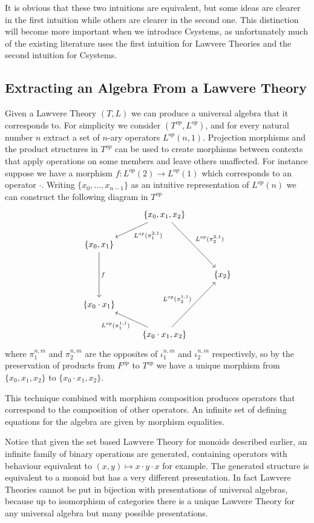 It is obvious that these two intuitions are equivalent, but some ideas are
clearer in the first intuition while others are clearer in the second one. This
distinction will become more important when we introduce Csystems, as
unfortunately much of the existing literature uses the first intuition for
Lawvere Theories and the second intuition for Csystems.

\subsection{Extracting an Algebra From a Lawvere Theory}
Given a Lawvere Theory $(T,L)$ we can produce a universal algebra that it
corresponds to. For simplicity we consider $(T^{op}, L^{op})$, and for every
natural number $n$ extract a set of $n$-ary operators $L^{op}(n,1)$. Projection
morphisms and the product structures in $T^{op}$ can be used to create morphisms
between contexts that apply operations on some members and leave others
unaffected. For instance suppose we have a morphism $f : L^{op}(2)\to L^{op}(1)$
which corresponds to an operator $\cdot$. Writing $\{x_0,\ldots, x_{n-1}\}$ as
an intuitive representation of $L^{op}(n)$ we can construct the following
diagram in $T^{op}$
\[
\begin{tikzcd}
    &\{x_0, x_1, x_2\}
    \ar[ld, "L^{op}({\pi_{1}^{2,1}})"]
    \ar[rdd, "L^{op}({\pi_{2}^{2, 1}})"]
    & \\
    \{x_0, x_1\}\ar[dd, "f"]&& \\
    &&\{x_2\} \\
    \{x_0\cdot x_1\}&& \\
    &\{x_0\cdot x_1, x_2\}
    \ar[ul, "L^{op}({\pi_{1}^{1,1}})"]
    \ar[uur, "L^{op}({\pi_{2}^{1,1}})"]
    &
\end{tikzcd}
\]
where $\pi_1^{n, m}$ and $\pi_2^{n, m}$ are the opposites of $\iota_1^{n,m}$ and
$\iota_2^{n,m}$ respectively, so by the preservation of products from $F^{op}$
to $T^{op}$ we have a unique morphism from $\{x_0, x_1, x_2\}$ to $\{x_0\cdot
x_1, x_2\}$.

This technique combined with morphism composition produces operators
that correspond to the composition of other operators. An infinite set of
defining equations for the algebra are given by morphism equalities.

Notice that given the set based Lawvere Theory for monoids described earlier, an
infinite family of binary operations are generated, containing operators with
behaviour equivalent to $(x,y)\mapsto x\cdot y\cdot x$ for example. The
generated structure is equivalent to a monoid but has a very different
presentation. In fact Lawvere Theories cannot be put in bijection with
presentations of universal algebras, because up to isomorphism of categories
there is a unique Lawvere Theory for any universal algebra but many possible
presentations.

